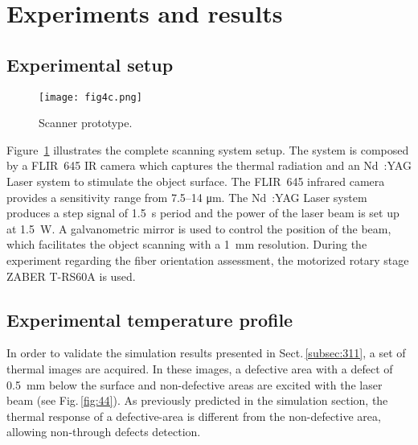\graphicspath{ {./content/exp/figure/} }

\section{Experiments and results}\label{sec:4}

\subsection{Experimental setup}

\begin{figure}
  \centering
  \hspace*{\fill}
	{\texttt{[image: fig4c.png]}}
  \hspace*{\fill}
  \caption{%
	Scanner prototype.}
  \label{fig:4}
\end{figure}

Figure~\ref{fig:4} illustrates the complete scanning system setup. The system is composed by a FLIR~645 IR camera which captures the thermal radiation and an Nd~:YAG Laser system to stimulate the object surface. 
The FLIR~645 infrared camera provides a sensitivity range from \numrange{7.5}{14} \si{\micro \metre}.
The Nd~:YAG Laser system produces a step signal of \SI{1.5}{\second} period and the power of the laser beam is set up at \SI{1.5}{\watt}. 
A galvanometric mirror is used to control the position of the beam, which facilitates the object scanning with a \SI{1}{\milli \metre} resolution. 
During the experiment regarding the fiber orientation assessment, the motorized rotary stage ZABER T-RS60A is used.

\subsection{Experimental temperature profile}\label{subsec:42}

In order to validate the simulation results presented in Sect.\,\ref{subsec:311}, a set of thermal images are acquired. 
In these images, a defective area with a defect of \SI{0.5}{\milli \metre} below the surface and non-defective areas are excited with the laser beam (see Fig.\,\ref{fig:44}).
As previously predicted in the simulation section, the thermal response of a defective-area is different from the non-defective area, allowing non-through defects detection.

